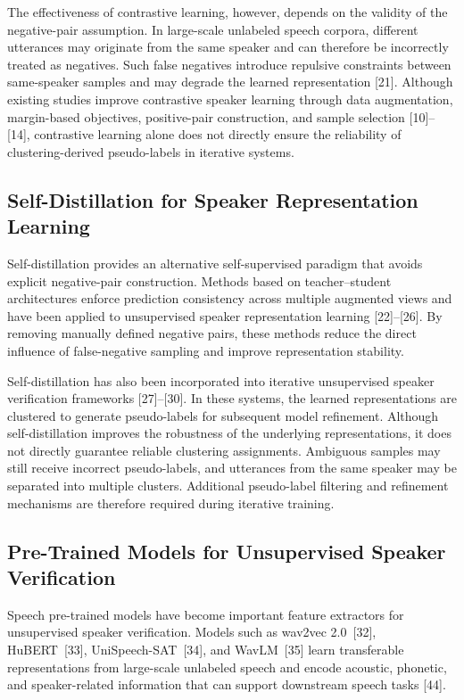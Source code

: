 \documentclass[lettersize,journal]{IEEEtran}
\begin{document}
The effectiveness of contrastive learning, however, depends on the
validity of the negative-pair assumption. In large-scale unlabeled
speech corpora, different utterances may originate from the same
speaker and can therefore be incorrectly treated as negatives. Such
false negatives introduce repulsive constraints between
same-speaker samples and may degrade the learned representation
[21]. Although existing studies improve contrastive speaker learning
through data augmentation, margin-based objectives, positive-pair
construction, and sample selection [10]--[14], contrastive learning
alone does not directly ensure the reliability of clustering-derived
pseudo-labels in iterative systems.

\subsection{Self-Distillation for Speaker Representation Learning}

Self-distillation provides an alternative self-supervised paradigm
that avoids explicit negative-pair construction. Methods based on
teacher--student architectures enforce prediction consistency across
multiple augmented views and have been applied to unsupervised
speaker representation learning [22]--[26]. By removing manually
defined negative pairs, these methods reduce the direct influence of
false-negative sampling and improve representation stability.

Self-distillation has also been incorporated into iterative
unsupervised speaker verification frameworks [27]--[30]. In these
systems, the learned representations are clustered to generate
pseudo-labels for subsequent model refinement. Although
self-distillation improves the robustness of the underlying
representations, it does not directly guarantee reliable clustering
assignments. Ambiguous samples may still receive incorrect
pseudo-labels, and utterances from the same speaker may be separated
into multiple clusters. Additional pseudo-label filtering and
refinement mechanisms are therefore required during iterative
training.

\subsection{Pre-Trained Models for Unsupervised Speaker Verification}

Speech pre-trained models have become important feature extractors
for unsupervised speaker verification. Models such as wav2vec
2.0~[32], HuBERT~[33], UniSpeech-SAT~[34], and WavLM~[35] learn
transferable representations from large-scale unlabeled speech and
encode acoustic, phonetic, and speaker-related information that can
support downstream speech tasks [44].
\end{document}
